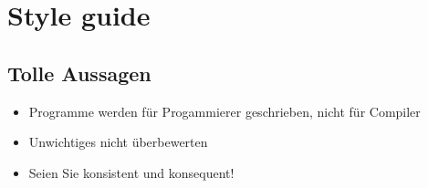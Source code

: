 \section{Style guide}
\subsection{Tolle Aussagen }
\begin{itemize}
	\item Programme werden für Progammierer geschrieben, nicht für Compiler
	\item Unwichtiges nicht überbewerten
	\item Seien Sie konsistent und konsequent!
\end{itemize}